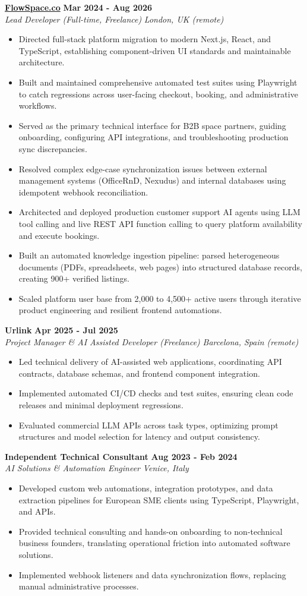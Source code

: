 \documentclass[10pt,a4paper]{article}
\newcommand{\role}[4]{%
  \textbf{#1} \hfill \textbf{#2}\\[1pt]%
  \textit{#3} \hfill \textit{#4}\\[2pt]%
}
\begin{document}
\role{\href{https://flowspace.co}{FlowSpace.co}}{Mar 2024 - Aug 2026}{Lead Developer (Full-time, Freelance)}{London, UK (remote)}
\begin{itemize}
  \item Directed full-stack platform migration to modern Next.js, React, and TypeScript, establishing component-driven UI standards and maintainable architecture.
  \item Built and maintained comprehensive automated test suites using Playwright to catch regressions across user-facing checkout, booking, and administrative workflows.
  \item Served as the primary technical interface for B2B space partners, guiding onboarding, configuring API integrations, and troubleshooting production sync discrepancies.
  \item Resolved complex edge-case synchronization issues between external management systems (OfficeRnD, Nexudus) and internal databases using idempotent webhook reconciliation.
  \item Architected and deployed production customer support AI agents using LLM tool calling and live REST API function calling to query platform availability and execute bookings.
  \item Built an automated knowledge ingestion pipeline: parsed heterogeneous documents (PDFs, spreadsheets, web pages) into structured database records, creating 900+ verified listings.
  \item Scaled platform user base from 2,000 to 4,500+ active users through iterative product engineering and resilient frontend automations.
\end{itemize}

\role{Urlink}{Apr 2025 - Jul 2025}{Project Manager \& AI Assisted Developer (Freelance)}{Barcelona, Spain (remote)}
\begin{itemize}
  \item Led technical delivery of AI-assisted web applications, coordinating API contracts, database schemas, and frontend component integration.
  \item Implemented automated CI/CD checks and test suites, ensuring clean code releases and minimal deployment regressions.
  \item Evaluated commercial LLM APIs across task types, optimizing prompt structures and model selection for latency and output consistency.
\end{itemize}

\role{Independent Technical Consultant}{Aug 2023 - Feb 2024}{AI Solutions \& Automation Engineer}{Venice, Italy}
\begin{itemize}
  \item Developed custom web automations, integration prototypes, and data extraction pipelines for European SME clients using TypeScript, Playwright, and APIs.
  \item Provided technical consulting and hands-on onboarding to non-technical business founders, translating operational friction into automated software solutions.
  \item Implemented webhook listeners and data synchronization flows, replacing manual administrative processes.
\end{itemize}
\end{document}
